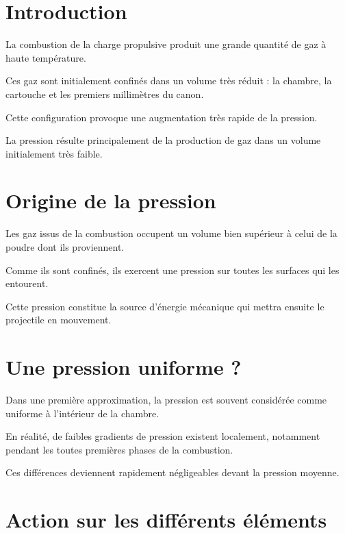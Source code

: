 
\section{Introduction}

La combustion de la charge propulsive produit une grande quantité de gaz à haute
température.

Ces gaz sont initialement confinés dans un volume très réduit : la chambre, la
cartouche et les premiers millimètres du canon.

Cette configuration provoque une augmentation très rapide de la pression.

\begin{aretenir}

La pression résulte principalement de la production de gaz dans un volume
initialement très faible.

\end{aretenir}

\section{Origine de la pression}

Les gaz issus de la combustion occupent un volume bien supérieur à celui de la
poudre dont ils proviennent.

Comme ils sont confinés, ils exercent une pression sur toutes les surfaces qui
les entourent.

Cette pression constitue la source d'énergie mécanique qui mettra ensuite le
projectile en mouvement.

\section{Une pression uniforme ?}

Dans une première approximation, la pression est souvent considérée comme
uniforme à l'intérieur de la chambre.

En réalité, de faibles gradients de pression existent localement, notamment
pendant les toutes premières phases de la combustion.

Ces différences deviennent rapidement négligeables devant la pression moyenne.

\section{Action sur les différents éléments}

